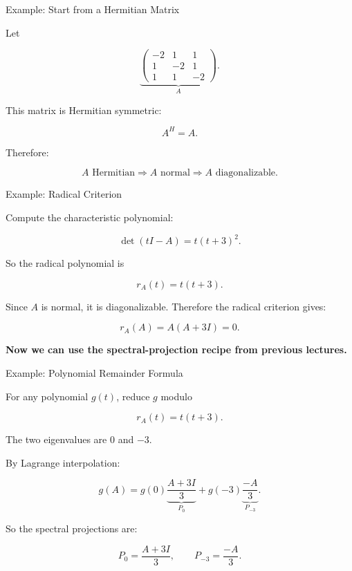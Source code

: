 \documentclass[10pt]{beamer}
\theoremstyle{definition}
\newcommand{\x}[1]{\alert{\textbf{#1}}}
\begin{document}
\begin{frame}{Example: Start from a Hermitian Matrix}

Let

\[
\underbrace{
\begin{pmatrix}
-2&1&1\\
1&-2&1\\
1&1&-2
\end{pmatrix}}_{A}.
\]

\vfill

This matrix is Hermitian symmetric:

$$
A^H=A.
$$

\vfill

Therefore:

$$
A\text{ Hermitian}
\Longrightarrow
A\text{ normal}
\Longrightarrow
A\text{ diagonalizable}.
$$

\end{frame}


\begin{frame}{Example: Radical Criterion}

Compute the characteristic polynomial:

$$
\det(tI-A)=t(t+3)^2.
$$

\vfill

So the radical polynomial is

$$
r_A(t)=t(t+3).
$$

\vfill

Since $A$ is normal, it is diagonalizable.  Therefore the radical criterion gives:

$$
\boxed{r_A(A)=A(A+3I)=0.}
$$

\vfill

\begin{center}
\x{Now we can use the spectral-projection recipe from previous lectures.}
\end{center}

\end{frame}


\begin{frame}{Example: Polynomial Remainder Formula}

For any polynomial $g(t)$, reduce $g$ modulo

$$
r_A(t)=t(t+3).
$$

\vfill

The two eigenvalues are $0$ and $-3$.

\vfill

By Lagrange interpolation:

$$
g(A)
=
g(0)\underbrace{\frac{A+3I}{3}}_{P_0}
+
g(-3)\underbrace{\frac{-A}{3}}_{P_{-3}}.
$$

\vfill

So the spectral projections are:

$$
\boxed{P_0=\frac{A+3I}{3}},
\qquad
\boxed{P_{-3}=\frac{-A}{3}}.
$$

\end{frame}
\end{document}
